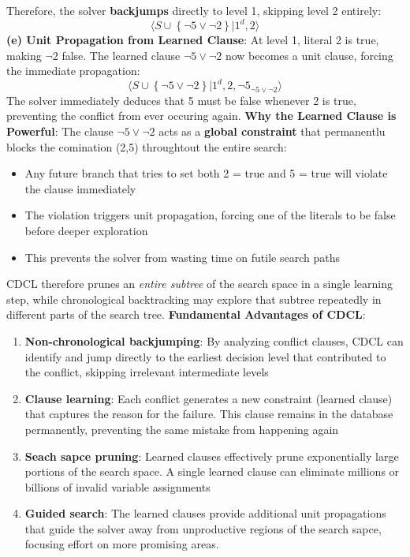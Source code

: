 \documentclass[a4paper]{article}
\theoremstyle{definition}
\begin{document}
\noindent 
\newline
Therefore, the solver \textbf{backjumps} directly to level 1, skipping level 2 entirely:
\[
  \langle S \cup \left\{ \lnot 5 \vee \lnot 2 \right\} \vert 1^d, 2 \rangle
\]
\textbf{(e) Unit Propagation from Learned Clause}: At level 1, literal 2 is true, making \( \lnot 2 \) false. 
The learned clause \( \lnot 5 \vee \lnot 2 \) now becomes a unit clause, forcing the immediate propagation:
\[
  \langle S \cup \left\{ \lnot 5 \vee \lnot 2 \right\} \vert 1^d, 2, \lnot 5_{\lnot 5 \vee \lnot 2} \rangle 
\]
The solver immediately deduces that 5 must be false whenever 2 is true, preventing the conflict from ever occuring again.
\vspace{1em}
\noindent 
\newline
\textbf{Why the Learned Clause is Powerful}:
\vspace{1em}
\noindent 
\newline
The clause \( \lnot 5 \vee \lnot 2 \) acts as a \textbf{global constraint} that permanentlu blocks the comination (2,5) throughtout the 
entire search:
\begin{itemize}
  \item Any future branch that tries to set both 2 = true and 5 = true will violate the clause immediately 
  \item The violation triggers unit propagation, forcing one of the literals to be false before deeper exploration 
  \item This prevents the solver from wasting time on futile search paths
\end{itemize}
CDCL therefore prunes an \textit{entire subtree} of the search space in a single learning step, while chronological 
backtracking may explore that subtree repeatedly in different parts of the search tree.
\vspace{1em}
\noindent 
\newline
\textbf{Fundamental Advantages of CDCL}:
\begin{enumerate}
  \item \textbf{Non-chronological backjumping}: By analyzing conflict clauses, CDCL can identify and jump directly to the earliest decision level that contributed to the conflict, skipping irrelevant intermediate levels 
  \item \textbf{Clause learning}: Each conflict generates a new constraint (learned clause) that captures the reason for the failure. This clause remains in the database permanently, preventing the same mistake from happening again 
  \item \textbf{Seach sapce pruning}: Learned clauses effectively prune exponentially large portions of the search space. A single learned clause can eliminate millions or billions of invalid variable assignments 
  \item \textbf{Guided search}: The learned clauses provide additional unit propagations that guide the solver away from unproductive regions of the search sapce, focusing effort on more promising areas.
\end{enumerate}
\end{document}
